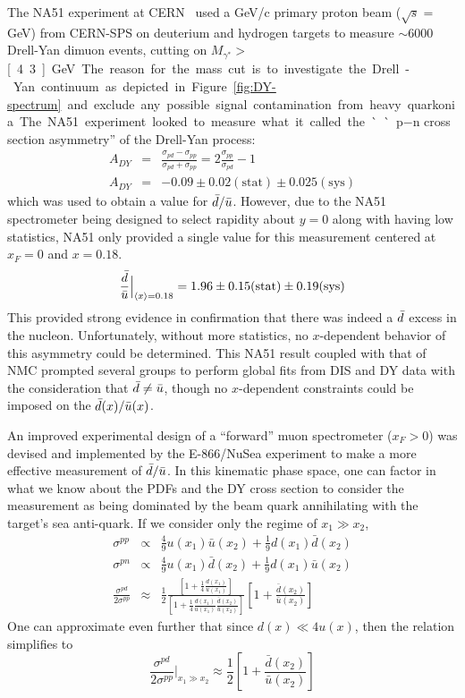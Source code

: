 The NA51 experiment at CERN~\cite{Baldit:1994jk} used a \unit[450]{GeV/c} primary proton beam ($\sqrt{s}=$\unit[29]{GeV}) from CERN-SPS on deuterium and hydrogen targets to measure $\sim$6000 Drell-Yan dimuon events, cutting on $M_{\gamma^*}>$\unit[4.3]{GeV}. The reason for the mass cut is to investigate the Drell-Yan continuum as depicted in Figure~\ref{fig:DY-spectrum} and exclude any possible signal contamination from heavy quarkonia. The NA51 experiment looked to measure what it called the ``p$-$n cross section asymmetry'' of the Drell-Yan process:
\begin{eqnarray}
A_{DY} & = & \frac{\sigma_{pd}-\sigma_{pp}}{\sigma_{pd}+\sigma_{pp}} = 2\frac{\sigma_{pp}}{\sigma_{pd}} - 1 \\
A_{DY} & = &  -0.09 \pm 0.02 (\text{stat}) \pm 0.025 (\text{sys})
\end{eqnarray}
which was used to obtain a value for $\bar{d}/\bar{u}$. However, due to the NA51 spectrometer being designed to select rapidity about $y=0$ along with having low statistics, NA51 only provided a single value for this measurement centered at $x_F=0$ and $x=0.18$.
\begin{equation}
\frac{\bar{d}}{\bar{u}} \Bigr|_{\langle x \rangle = 0.18} = 1.96 \pm 0.15\text{(stat)} \pm 0.19\text{(sys)}
\end{equation}
This provided strong evidence in confirmation that there was indeed a $\bar{d}$ excess in the nucleon. Unfortunately, without more statistics, no $x$-dependent behavior of this asymmetry could be determined. This NA51 result coupled with that of NMC prompted several groups to perform global fits from DIS and DY data with the consideration that $\bar{d}\neq\bar{u}$, though no $x$-dependent constraints could be imposed on the $\bar{d}(x)/\bar{u}(x)$.

An improved experimental design of a ``forward'' muon spectrometer ($x_F>0$) was devised and implemented by the E-866/NuSea experiment to make a more effective measurement of $\bar{d}/\bar{u}$. In this kinematic phase space, one can factor in what we know about the PDFs and the DY cross section to consider the measurement as being dominated by the beam quark annihilating with the target's sea anti-quark. If we consider only the regime of $x_1 \gg x_2$,
\begin{eqnarray}
\sigma^{pp} & \propto & \frac{4}{9} u(x_1)\bar{u}(x_2) + \frac{1}{9}d(x_1)\bar{d}(x_2) \\
\sigma^{pn} & \propto & \frac{4}{9} u(x_1)\bar{d}(x_2) + \frac{1}{9}d(x_1)\bar{u}(x_2) \\
\frac{\sigma^{pd}}{2\sigma^{pp}} & \approx & \frac{1}{2} \frac{\left[1 + \frac{1}{4} \frac{d(x_1)}{u(x_1)}\right]}{\left[1 + \frac{1}{4} \frac{d(x_1)}{u(x_1)}\frac{\bar{d}(x_2)}{\bar{u}(x_2)}\right]} \left[1 + \frac{\bar{d}(x_2)}{\bar{u}(x_2)}\right]
\end{eqnarray}
One can approximate even further that since $d(x) \ll 4 u(x)$, then the relation simplifies to
\begin{equation}
\frac{\sigma^{pd}}{2\sigma^{pp}}\Bigr|_{x_1\gg x_2} \approx
\frac{1}{2} \left[1 + \frac{\bar{d}(x_2)}{\bar{u}(x_2)}\right]
\label{eq:866-dbar-ubar}
\end{equation}

